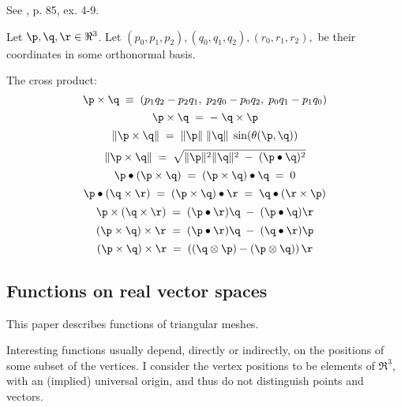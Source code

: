 See \cite{spivak-1965}, p. 85, ex. 4-9.

Let $\p, \q, \r \in \Re^3$.
Let $(p_0,p_1,p_2), (q_0,q_1,q_2), (r_0,r_1,r_2), $ be their coordinates
in some orthonormal basis.

The cross product:
\begin{equation}
\p \times \q  \; \equiv \; (p_1 q_2 - p_2 q_1, \; p_2 q_0 - p_0 q_2, \; p_0 q_1 - p_1 q_0)
\end{equation}
\begin{equation}
\p \times \q  \; = \; - \; \q \times \p
\end{equation}
\begin{equation}
\| \p \times \q \| \; = \; \| \p \| \; \| \q \| \; \sin(\theta(\p,\q))
\end{equation}
\begin{equation}
\| \p \times \q \|  \; = \;  \sqrt{\| \p \|^2 \| \q \|^2 \; - \; (\p \bullet \q)^2}
\end{equation}
\begin{equation}
\p \bullet ( \p \times \q ) \; = \; ( \p \times \q ) \bullet \q \; = \; 0
\end{equation}
\begin{equation}
\label{eq:dot_cross}
\p \bullet ( \q \times \r ) \; = \; ( \p \times \q ) \bullet \r \; = \; \q \bullet ( \r \times \p )
\end{equation}
\begin{equation}
\p \times ( \q \times \r ) \; = \; ( \p \bullet \r ) \q \; - \; (\p \bullet \q) \r
\end{equation}
\begin{equation}
( \p \times \q ) \times \r \; = \; ( \p \bullet \r ) \q \; - \; (\q \bullet \r) \p
\end{equation}
\begin{equation}
( \p \times \q ) \times \r \; = \; \left((\q \otimes \p) - (\p \otimes \q)\right) \r
\end{equation}



\subsection{Functions on real vector spaces}
\label{sec:functions}

This paper describes functions of triangular meshes.

Interesting functions usually depend, directly or indirectly,
on the positions of some subset of the vertices.
I consider the vertex positions to be elements of $\Re^3$,
with an (implied) universal origin,
and thus do not distinguish points and vectors.

